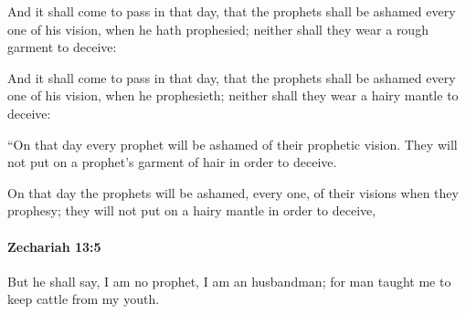 			And it shall come to pass in that day, that the prophets shall be ashamed every one of his vision, when he hath prophesied; neither shall they wear a rough garment to deceive:

			\begin{versebox}
					\item[BHS] 
					\item[LXX] 
					\item[ASV] And it shall come to pass in that day, that the prophets shall be ashamed every one of his vision, when he prophesieth; neither shall they wear a hairy mantle to deceive:
					\item[NIV] “On that day every prophet will be ashamed of their prophetic vision. They will not put on a prophet’s garment of hair in order to deceive.
					\item[NRSV] On that day the prophets will be ashamed, every one, of their visions when they prophesy; they will not put on a hairy mantle in order to deceive,
			\end{versebox}

		\paragraph{Zechariah 13:5} %
			\label{ZECHARIAH-13-5}

			But he shall say, I am no prophet, I am an husbandman; for man taught me to keep cattle from my youth.

